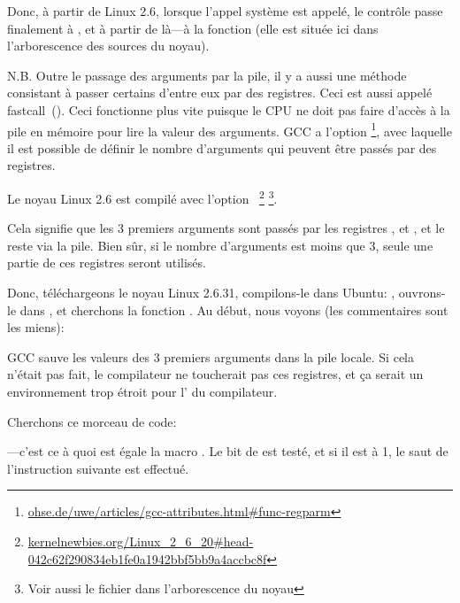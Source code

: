 Donc, à partir de Linux 2.6, lorsque l'appel système  est appelé, le
contrôle passe finalement à , et à partir de là---à la fonction
 (elle est située ici  dans l'arborescence des
sources du noyau).

\newcommand{\URLREGPARM}{\href{http://go.yurichev.com/17040}{ohse.de/uwe/articles/gcc-attributes.html\#func-regparm}}

\label{regparm}
N.B. Outre le passage des arguments par la pile, il y a aussi une méthode consistant
à passer certains d'entre eux par des registres. Ceci est aussi appelé fastcall~().
Ceci fonctionne plus vite puisque le CPU ne doit pas faire d'accès à la pile en mémoire
pour lire la valeur des arguments.
GCC a l'option \footnote{\URLREGPARM}, avec laquelle il est possible
de définir le nombre d'arguments qui peuvent être passés par des registres.

\newcommand{\URLKERNELNEWB}{\href{http://go.yurichev.com/17066}{kernelnewbies.org/Linux\_2\_6\_20\#head-042c62f290834eb1fe0a1942bbf5bb9a4accbc8f}}
\newcommand{\CALLINGHFILE}{arch/x86/include/asm/calling.h}

Le noyau Linux 2.6 est compilé avec l'option ~\footnote{\URLKERNELNEWB}
\footnote{Voir aussi le fichier \TT{\CALLINGHFILE} dans l'arborescence du noyau}.

Cela signifie que les 3 premiers arguments sont passés par les registres \EAX, \EDX
et \ECX, et le reste via la pile.
Bien sûr, si le nombre d'arguments est moins que 3, seule une partie de ces registres
seront utilisés.

Donc, téléchargeons le noyau Linux 2.6.31, compilons-le dans Ubuntu: ,
ouvrons-le dans \IDA, et cherchons la fonction . Au début, nous
voyons (les commentaires sont les miens):



GCC sauve les valeurs des 3 premiers arguments dans la pile locale.
Si cela n'était pas fait, le compilateur ne toucherait pas ces registres, et ça serait
un environnement trop étroit pour l'
du compilateur.

Cherchons ce morceau de code:



---c'est ce à quoi est égale la macro .
Le bit  de  est testé, et si il est à 1, le saut de l'instruction
\JNZ suivante est effectué.

